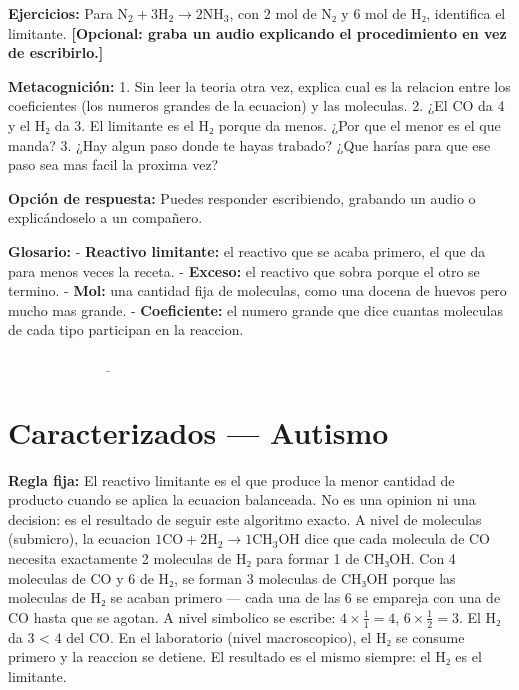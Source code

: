 \documentclass[
  spanish,
  letterpaper,
  12pt,
  oneside,
  open=any]{scrbook}
\newcommand{\setcolorsection}[2]{%
  \definecolor{currentsectionbg}{HTML}{#1}%
  \definecolor{currentsectionborder}{HTML}{#2}%
}
\begin{document}
\textbf{Ejercicios:} Para
\(\text{N}_2 + 3\text{H}_2 \rightarrow 2\text{NH}_3\), con \(2\) mol de
N₂ y \(6\) mol de H₂, identifica el limitante. \textbf{{[}Opcional:
graba un audio explicando el procedimiento en vez de escribirlo.{]}}

\textbf{Metacognición:} 1. Sin leer la teoria otra vez, explica cual es
la relacion entre los coeficientes (los numeros grandes de la ecuacion)
y las moleculas. 2. ¿El CO da 4 y el H₂ da 3. El limitante es el H₂
porque da menos. ¿Por que el menor es el que manda? 3. ¿Hay algun paso
donde te hayas trabado? ¿Que harías para que ese paso sea mas facil la
proxima vez?

\textbf{Opción de respuesta:} Puedes responder escribiendo, grabando un
audio o explicándoselo a un compañero.

\textbf{Glosario:} - \textbf{Reactivo limitante:} el reactivo que se
acaba primero, el que da para menos veces la receta. - \textbf{Exceso:}
el reactivo que sobra porque el otro se termino. - \textbf{Mol:} una
cantidad fija de moleculas, como una docena de huevos pero mucho mas
grande. - \textbf{Coeficiente:} el numero grande que dice cuantas
moleculas de cada tipo participan en la reaccion.

\(\underline{\hspace{6cm}}\)

\setcolorsection{d6c7e7}{c0b0d8}

\section{Caracterizados --- Autismo}\label{caracterizados-autismo}

\textbf{Regla fija:} El reactivo limitante es el que produce la menor
cantidad de producto cuando se aplica la ecuacion balanceada. No es una
opinion ni una decision: es el resultado de seguir este algoritmo
exacto. A nivel de moleculas (submicro), la ecuacion
\(1\text{CO} + 2\text{H}_2 \rightarrow 1\text{CH}_3\text{OH}\) dice que
cada molecula de CO necesita exactamente 2 moleculas de H₂ para formar 1
de CH₃OH. Con 4 moleculas de CO y 6 de H₂, se forman 3 moleculas de
CH₃OH porque las moleculas de H₂ se acaban primero --- cada una de las 6
se empareja con una de CO hasta que se agotan. A nivel simbolico se
escribe: \(4 \times \frac{1}{1} = 4\), \(6 \times \frac{1}{2} = 3\). El
H₂ da \(3\) \textless{} \(4\) del CO. En el laboratorio (nivel
macroscopico), el H₂ se consume primero y la reaccion se detiene. El
resultado es el mismo siempre: el H₂ es el limitante.
\end{document}
